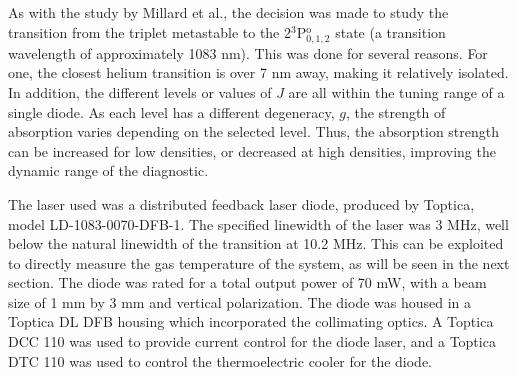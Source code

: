 As with the study by Millard et al., the decision was made to study the
transition from the triplet metastable to the 2$^3$P$^\mathrm{o}_{0,1,2}$ state
(a transition wavelength of approximately 1083 nm). This was done for several
reasons. For one, the closest helium transition is over 7 nm away, making it
relatively isolated. In addition, the different levels or values of $J$ are all
within the tuning range of a single diode. As each level has a different
degeneracy, $g$, the strength of absorption varies depending on the selected
level. Thus, the absorption strength can be increased for low densities, or
decreased at high densities, improving the dynamic range of the diagnostic.

The laser used was a distributed feedback laser diode, produced by Toptica,
model LD-1083-0070-DFB-1. The specified linewidth of the laser was 3 MHz, well
below the natural linewidth of the transition at 10.2 MHz. This can be exploited
to directly measure the gas temperature of the system, as will be seen in the
next section. The diode was rated for a total output power of 70 mW, with a beam
size of 1 mm by 3 mm and vertical polarization. The diode was housed in a
Toptica DL DFB housing which incorporated the collimating optics. A Toptica DCC
110 was used to provide current control for the diode laser, and a Toptica DTC
110 was used to control the thermoelectric cooler for the diode.

